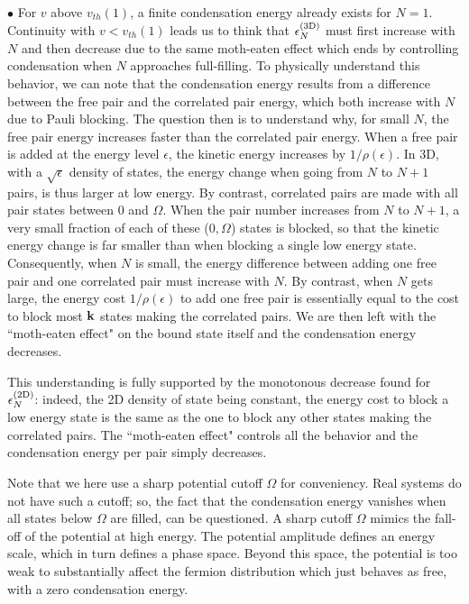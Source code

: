 \documentclass[5p,twocolumn]{elsarticle}
\begin{document}
$\bullet$  For $v$ above $v_{th}(1)$, a finite condensation energy already exists for $N=1$. Continuity with $v<v_{th}(1)$ leads us to think that $\epsilon^{{\text{(3D)}}}_N$ must first increase with $N$ and then decrease due to the same moth-eaten effect which ends by controlling condensation when $N$ approaches full-filling. 
To physically understand this behavior, we can note that the condensation energy results from a difference between the free pair and the correlated pair energy, which both increase with $N$ due to Pauli blocking.  The question then is to understand why, for small $N$, the free pair energy increases faster than the correlated pair energy. When a free pair is added at the energy level $\epsilon$, the kinetic energy increases by $1/\rho(\epsilon)$.  In 3D, with a $\sqrt{\epsilon}$ density of states, the energy change when going from $N$ to $N+1$ pairs, is thus larger at low energy. By contrast, correlated pairs are made with all pair states between $0$ and $\Omega$. When the pair number increases from $N$ to $N+1$, a very small fraction of each of these ($0,\Omega$) states is blocked, so that the kinetic energy change is far smaller than when blocking a single low energy state.  Consequently, when $N$ is small,  the energy difference between adding one free pair and one correlated pair must increase with $N$. By contrast, when $N$ gets large, the energy cost $1/\rho(\epsilon)$ to add one free pair is essentially equal to the cost to block most $\mathbf{k}$ states making the correlated pairs.  We are then left with the ``moth-eaten effect" on the bound state itself and the condensation energy decreases. 

This understanding is fully supported by the monotonous decrease  found for $\epsilon^{{\text{(2D)}}}_N$: indeed, the 2D density of state being constant, the energy cost to block a low energy state is the same as the one to block  any other states making the correlated pairs. The ``moth-eaten effect" controls all the behavior and the condensation energy per pair simply decreases.

Note that we here use a sharp potential cutoff $\Omega$ for conveniency.  Real systems do not have such a cutoff; so,   the fact that the condensation energy vanishes when all states below $\Omega$ are filled, can be questioned.  A sharp cutoff $\Omega$ mimics the fall-off of the potential at high energy.  The potential amplitude defines an energy scale, which in turn defines a phase space.  Beyond this space, the potential is too weak to substantially affect the fermion distribution which just behaves as free, with a zero condensation energy. 
\end{document}
